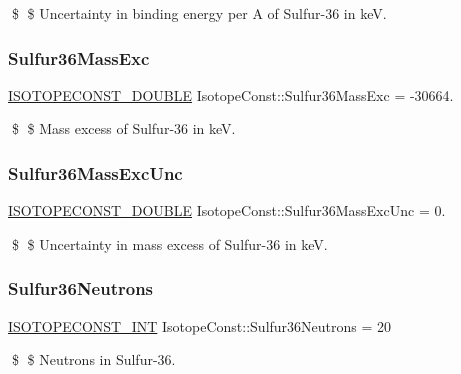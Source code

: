 \$ \$ Uncertainty in binding energy per A of Sulfur-\/36 in keV. \mbox{\label{group___isotope_const-_sulfur-_s36_gad6ecc4364b969c85fa5f47e68ddef2e1}} 
\subsubsection{\texorpdfstring{Sulfur36\+Mass\+Exc}{Sulfur36MassExc}}
{\footnotesize\ttfamily \mbox{\hyperlink{group___isotope_const-_macros_ga8f45a7272ce02c0b4c65c44636ed719a}{I\+S\+O\+T\+O\+P\+E\+C\+O\+N\+S\+T\+\_\+\+D\+O\+U\+B\+LE}} Isotope\+Const\+::\+Sulfur36\+Mass\+Exc = -\/30664.}

\$ \$ Mass excess of Sulfur-\/36 in keV. \mbox{\label{group___isotope_const-_sulfur-_s36_ga5797f6cc2a8c2191f88e31cc3f14e39f}} 
\subsubsection{\texorpdfstring{Sulfur36\+Mass\+Exc\+Unc}{Sulfur36MassExcUnc}}
{\footnotesize\ttfamily \mbox{\hyperlink{group___isotope_const-_macros_ga8f45a7272ce02c0b4c65c44636ed719a}{I\+S\+O\+T\+O\+P\+E\+C\+O\+N\+S\+T\+\_\+\+D\+O\+U\+B\+LE}} Isotope\+Const\+::\+Sulfur36\+Mass\+Exc\+Unc = 0.}

\$ \$ Uncertainty in mass excess of Sulfur-\/36 in keV. \mbox{\label{group___isotope_const-_sulfur-_s36_ga16fff151ed739fad2cf480c777947f7f}} 
\subsubsection{\texorpdfstring{Sulfur36\+Neutrons}{Sulfur36Neutrons}}
{\footnotesize\ttfamily \mbox{\hyperlink{group___isotope_const-_macros_ga5f18360b3e99483a35c32d789e62621c}{I\+S\+O\+T\+O\+P\+E\+C\+O\+N\+S\+T\+\_\+\+I\+NT}} Isotope\+Const\+::\+Sulfur36\+Neutrons = 20}

\$ \$ Neutrons in Sulfur-\/36. \mbox{\label{group___isotope_const-_sulfur-_s36_ga880c61a595dbc5c34cc2b5799a82b14b}} 
